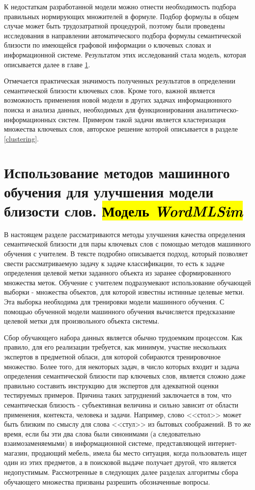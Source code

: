 К недостаткам разработанной модели можно отнести необходимость подбора правильных нормирующих множителей в формуле. Подбор формулы в общем случае может быть трудозатратной процедурой, поэтому были проведены исследования в направлении автоматического подбора формулы семантической близости по имеющейся графовой информации о ключевых словах и информационной системе. Результатом этих исследований стала модель, которая описывается далее в главе \ref{ml_sim}.

Отмечается практическая значимость полученных результатов в определении семантической близости ключевых слов. Кроме того, важной является возможность применения новой модели в других задачах информационного поиска и анализа данных, необходимых для функционирования аналитическо-информационных систем. Примером такой задачи является кластеризация множества ключевых слов, авторское решение которой описывается в разделе \ref{clustering}.

\section{Использование методов машинного обучения для улучшения модели близости слов. \hl{Модель \emph{WordMLSim}}} \label{ml_sim}

В настоящем разделе рассматриваются методы улучшения качества определения семантической близости для пары ключевых слов с помощью методов машинного обучения с учителем. В тексте подробно описывается подход, который позволяет свести рассматриваемую задачу к задаче классификации, то есть к задаче определения целевой метки заданного объекта из заранее сформированного множества меток. Обучение с учителем подразумевают использование обучающей выборки - множества объектов, для которой известны истинные целевые метки. Эта выборка необходима для тренировки модели машинного обучения. С помощью обученной модели машинного обучения вычисляется предсказание целевой метки для произвольного объекта системы.

Сбор обучающего набора данных является обычно трудоемким процессом. Как правило, для его реализации требуется, как минимум, участие нескольких экспертов в предметной обласи, для которой собираются тренировочное множество. Более того, для некоторых задач, в число которых входит и задача определения семантической близости пар ключевых слов, является сложно даже правильно составить инструкцию для экспертов для адекватной оценки тестируемых примеров. Причина таких затруднений заключается в том, что семантическая близость - субъективная величина и сильно зависит от области применения, контекста, человека и задачи. Например, слово <<стол>> может быть близким по смыслу для слова <<стул>> из бытовых соображений. В то же время, если бы эти два слова были синонимами (а следовательно взаимозаменяемыми) в информационной системе, представляющей интернет-магазин, продающий мебель, имела бы место ситуация, когда пользователь ищет один из этих предметов, а в поисковой выдаче получает другой, что является недопустимым. Рассмотренные в следующих далее разделах алгоритмы сбора обучающего множества призваны разрешить обозначенные вопросы.

